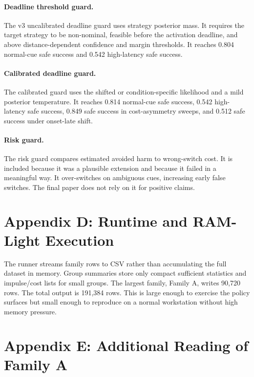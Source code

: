 \documentclass{article}
\begin{document}
\paragraph{Deadline threshold guard.}
The v3 uncalibrated deadline guard uses strategy posterior mass. It requires the target strategy to be non-nominal, feasible before the activation deadline, and above distance-dependent confidence and margin thresholds. It reaches 0.804 normal-cue safe success and 0.542 high-latency safe success.

\paragraph{Calibrated deadline guard.}
The calibrated guard uses the shifted or condition-specific likelihood and a mild posterior temperature. It reaches 0.814 normal-cue safe success, 0.542 high-latency safe success, 0.849 safe success in cost-asymmetry sweeps, and 0.512 safe success under onset-late shift.

\paragraph{Risk guard.}
The risk guard compares estimated avoided harm to wrong-switch cost. It is included because it was a plausible extension and because it failed in a meaningful way. It over-switches on ambiguous cues, increasing early false switches. The final paper does not rely on it for positive claims.

\section{Appendix D: Runtime and RAM-Light Execution}



The runner streams family rows to CSV rather than accumulating the full dataset in memory. Group summaries store only compact sufficient statistics and impulse/cost lists for small groups. The largest family, Family A, writes 90,720 rows. The total output is 191,384 rows. This is large enough to exercise the policy surfaces but small enough to reproduce on a normal workstation without high memory pressure.

\section{Appendix E: Additional Reading of Family A}
\end{document}
